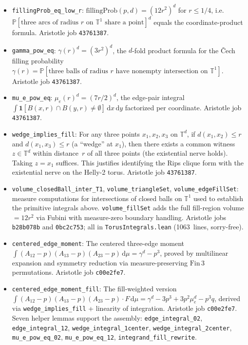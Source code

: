 \documentclass[reqno,12pt]{amsart}
\newcommand{\fillingP}{\mathrm{fillingProb}}
\newcommand{\TT}{\mathbb{T}}         %
\newcommand{\PP}{\mathbb{P}}
\newcommand{\lean}[1]{\textup{\texttt{\small #1}}}
\theoremstyle{plain}
\theoremstyle{definition}
\theoremstyle{remark}
\begin{document}
\begin{itemize}[leftmargin=*, itemsep=4pt]
\item \lean{fillingProb\_eq\_low\_r}: $\fillingP(p,d) = (12r^2)^d$ for $r \leq 1/4$,
  i.e.\ $\PP[\text{three arcs of radius }r\text{ on }\TT^1\text{ share a point}]^d$
  equals the coordinate-product formula. Aristotle job \texttt{43761387}.

\item \lean{gamma\_pow\_eq}: $\gamma(r)^d = (3r^2)^d$, the $d$-fold product formula for the
  Čech filling probability $\gamma(r) = \PP[\text{three balls of radius }r\text{ have
  nonempty intersection on }\TT^1]$. Aristotle job \texttt{43761387}.

\item \lean{mu\_e\_pow\_eq}: $\mu_e(r)^d = (7r/2)^d$, the edge-pair integral
  $\int \mathbf{1}[B(x,r)\cap B(y,r)\neq\emptyset]\,\mathrm{d}x\,\mathrm{d}y$
  factorized per coordinate. Aristotle job \texttt{43761387}.

\item \lean{wedge\_implies\_fill}: For any three points $x_1, x_2, x_3$ on $\TT^d$,
  if $d(x_1, x_2) \le r$ and $d(x_1, x_3) \le r$ (a ``wedge'' at $x_1$), then there
  exists a common witness $z \in \TT^d$ within distance~$r$ of all three points (the
  existential nerve holds). Taking $z = x_1$ suffices. This justifies identifying the
  Rips clique form with the existential nerve on the Helly-2 torus. Aristotle job
  \texttt{43761387}.

\item \lean{volume\_closedBall\_inter\_T1}, \lean{volume\_triangleSet},
  \lean{volume\_edgeFillSet}: measure computations for intersections of closed balls on
  $\TT^1$ used to establish the primitive integrals above. \lean{volume\_fillSet} adds the
  full fill-region volume $= 12r^2$ via Fubini with measure-zero boundary handling.
  Aristotle jobs \texttt{b28b078b} and \texttt{0bc2c753}; all in
  \texttt{TorusIntegrals.lean} (1063~lines, sorry-free).

\item \lean{centered\_edge\_moment}: The centered three-edge moment
  $\int (A_{12}-p)(A_{13}-p)(A_{23}-p)\,\mathrm{d}\mu = \gamma^d - p^3$, proved by
  multilinear expansion and symmetry reduction via measure-preserving $\mathrm{Fin}\,3$
  permutations. Aristotle job \texttt{c00e2fe7}.

\item \lean{centered\_edge\_moment\_fill}: The fill-weighted version
  $\int (A_{12}-p)(A_{13}-p)(A_{23}-p)\cdot F\,\mathrm{d}\mu
  = \gamma^d - 3p^3 + 3p^2\mu_e^d - p^3 q$,
  derived via \lean{wedge\_implies\_fill} + linearity of integration.
  Aristotle job \texttt{c00e2fe7}.
  Seven helper lemmas support the assembly: \lean{edge\_integral\_02},
  \lean{edge\_integral\_12}, \lean{wedge\_integral\_1center},
  \lean{wedge\_integral\_2center}, \lean{mu\_e\_pow\_eq\_02}, \lean{mu\_e\_pow\_eq\_12},
  \lean{integrand\_fill\_rewrite}.


\end{itemize}
\end{document}
